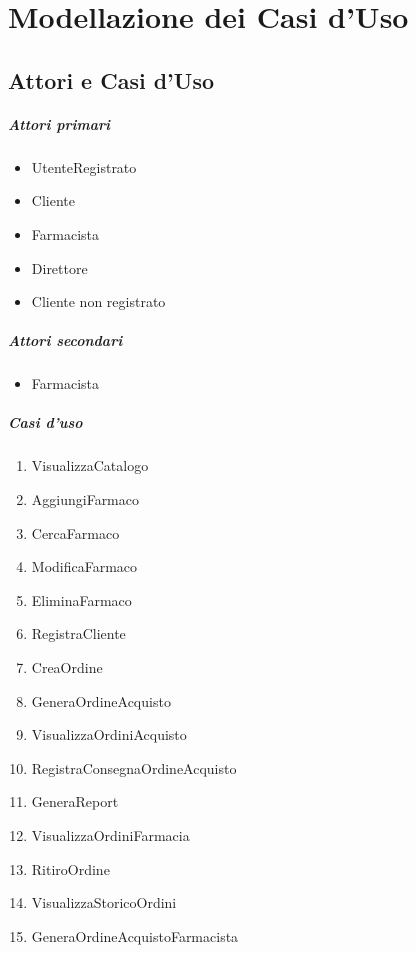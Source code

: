 \chapter{Modellazione dei Casi d'Uso}

\section{Attori e Casi d'Uso}

\paragraph{Attori primari}
\begin{itemize}
	\item UtenteRegistrato
	\item Cliente
	\item Farmacista
	\item Direttore
	\item Cliente non registrato
\end{itemize}

\paragraph{Attori secondari}
\begin{itemize}
	\item Farmacista
\end{itemize}

\paragraph{Casi d'uso}
\begin{enumerate}
	\item VisualizzaCatalogo %
	\item AggiungiFarmaco %
	\item CercaFarmaco %
	\item ModificaFarmaco %
	\item EliminaFarmaco %
	\item RegistraCliente %
	\item CreaOrdine %
	\item GeneraOrdineAcquisto %
	\item VisualizzaOrdiniAcquisto %
	\item RegistraConsegnaOrdineAcquisto %
	\item GeneraReport %
	\item VisualizzaOrdiniFarmacia %
	\item RitiroOrdine %
	\item VisualizzaStoricoOrdini %
	\item GeneraOrdineAcquistoFarmacista %
\end{enumerate}

